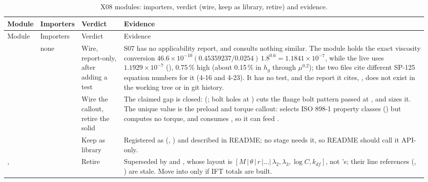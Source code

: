 \begingroup\chtenTables
\begin{longtable}{@{}P{2.4cm}P{2.6cm}P{1.7cm}P{9.4cm}@{}}
\caption{X08 modules: importers, verdict (wire, keep as library, retire) and evidence.}\label{tab:x08-recs}\\
\toprule Module & Importers & Verdict & Evidence \\ \midrule\endfirsthead
\toprule Module & Importers & Verdict & Evidence \\ \midrule\endhead
{} & none & Wire, report-only, after adding a test & S07 has no applicability report, and  consults nothing similar. The module holds the exact viscosity conversion $46.6\times10^{-10}(0.45359237/0.0254)\,1.8^{0.6}=1.1841\times10^{-7}$, while the live  uses $1.1929\times10^{-7}$ (), 0.75\,\% high (about 0.15\,\% in $h_g$ through $\mu^{0.2}$); the two files cite different SP-125 equation numbers for it (4-16 and 4-23). It has no test, and the report it cites, , does not exist in the working tree or in git history. \\
 &  & Wire the callout, retire the solid & The claimed gap is closed:  (; bolt holes at ) cuts the flange bolt pattern passed at , and  sizes it. The unique value is the preload and torque callout:  selects ISO 898-1 property classes () but computes no torque, and  consumes , so it can feed . \\
 &  & Keep as library & Registered as  (, ) and described in README; no stage needs it, so README should call it API-only. \\
,  &  & Retire & Superseded by  and , whose layout is $[M\,|\,\theta\,|\,r\,|\ldots|\,\lambda_2,\lambda_3,\log C,k_{df}]$, not 's; their line references (, ) are stale. Move  into  only if IFT totals are built. \\

\end{longtable}
